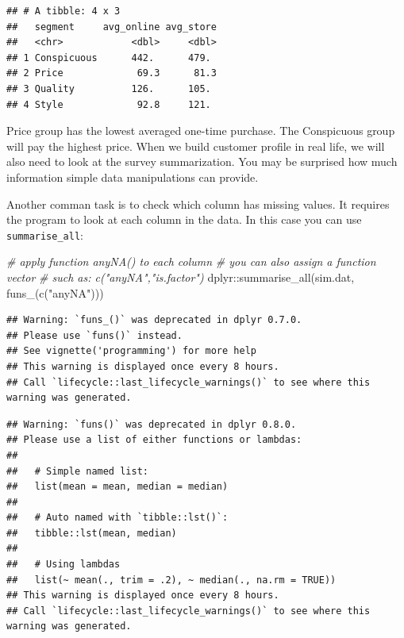 \documentclass[
  12pt,
]{krantz}
\makeatletter
\newenvironment{Shaded}{\begin{snugshade}}{\end{snugshade}}
\newcommand{\CommentTok}[1]{\textcolor[rgb]{0.37,0.37,0.37}{\textit{#1}}}
\newcommand{\FunctionTok}[1]{\textcolor[rgb]{0,0,0}{#1}}
\newcommand{\NormalTok}[1]{#1}
\newcommand{\SpecialCharTok}[1]{\textcolor[rgb]{0,0,0}{#1}}
\newcommand{\StringTok}[1]{\textcolor[rgb]{0.5,0.5,0.5}{#1}}
\newenvironment{kframe}{%
\medskip{}
\setlength{\fboxsep}{.8em}
 \def\at@end@of@kframe{}%
 \ifinner\ifhmode%
  \def\at@end@of@kframe{\end{minipage}}%
  \begin{minipage}{\columnwidth}%
 \fi\fi%
 \def\FrameCommand##1{\hskip\@totalleftmargin \hskip-\fboxsep
 \colorbox{shadecolor}{##1}\hskip-\fboxsep
     \hskip-\linewidth \hskip-\@totalleftmargin \hskip\columnwidth}%
 \MakeFramed {\advance\hsize-\width
   \@totalleftmargin\z@ \linewidth\hsize
   \@setminipage}}%
 {\par\unskip\endMakeFramed%
 \at@end@of@kframe}
\renewenvironment{Shaded}{\begin{kframe}}{\end{kframe}}
\makeatother
\begin{document}
\begin{verbatim}
## # A tibble: 4 x 3
##   segment     avg_online avg_store
##   <chr>            <dbl>     <dbl>
## 1 Conspicuous      442.      479. 
## 2 Price             69.3      81.3
## 3 Quality          126.      105. 
## 4 Style             92.8     121.
\end{verbatim}

Price group has the lowest averaged one-time purchase. The Conspicuous group will pay the highest price. When we build customer profile in real life, we will also need to look at the survey summarization. You may be surprised how much information simple data manipulations can provide.

Another comman task is to check which column has missing values. It requires the program to look at each column in the data. In this case you can use \texttt{summarise\_all}:

\begin{Shaded}
\begin{Highlighting}[]
\CommentTok{\# apply function anyNA() to each column}
\CommentTok{\# you can also assign a function vector }
\CommentTok{\# such as: c("anyNA","is.factor")}
\NormalTok{dplyr}\SpecialCharTok{::}\FunctionTok{summarise\_all}\NormalTok{(sim.dat, }\FunctionTok{funs\_}\NormalTok{(}\FunctionTok{c}\NormalTok{(}\StringTok{"anyNA"}\NormalTok{)))}
\end{Highlighting}
\end{Shaded}

\begin{verbatim}
## Warning: `funs_()` was deprecated in dplyr 0.7.0.
## Please use `funs()` instead.
## See vignette('programming') for more help
## This warning is displayed once every 8 hours.
## Call `lifecycle::last_lifecycle_warnings()` to see where this warning was generated.
\end{verbatim}

\begin{verbatim}
## Warning: `funs()` was deprecated in dplyr 0.8.0.
## Please use a list of either functions or lambdas: 
## 
##   # Simple named list: 
##   list(mean = mean, median = median)
## 
##   # Auto named with `tibble::lst()`: 
##   tibble::lst(mean, median)
## 
##   # Using lambdas
##   list(~ mean(., trim = .2), ~ median(., na.rm = TRUE))
## This warning is displayed once every 8 hours.
## Call `lifecycle::last_lifecycle_warnings()` to see where this warning was generated.
\end{verbatim}
\end{document}
